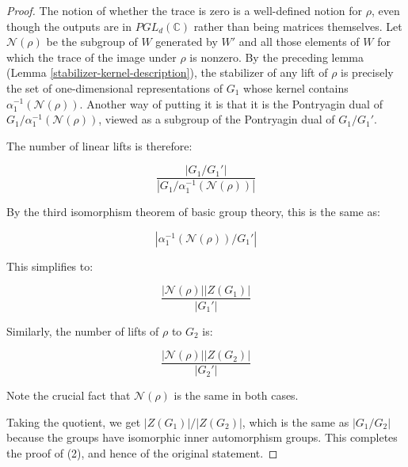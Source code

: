 \begin{proof}
  The notion of whether the trace is zero is a well-defined notion for
  $\rho$, even though the outputs are in $PGL_d(\mathbb{C})$ rather
  than being matrices themselves. Let $\mathcal{N}(\rho)$ be the
  subgroup of $W$ generated by $W'$ and all those elements of $W$ for
  which the trace of the image under $\rho$ is nonzero. By the
  preceding lemma (Lemma \ref{stabilizer-kernel-description}), the
  stabilizer of any lift of $\rho$ is precisely the set of
  one-dimensional representations of $G_1$ whose kernel contains
  $\alpha_1^{-1}(\mathcal{N}(\rho))$. Another way of putting it is
  that it is the Pontryagin dual of
  $G_1/\alpha_1^{-1}(\mathcal{N}(\rho))$, viewed as a subgroup of the
  Pontryagin dual of $G_1/G_1'$.


  The number of linear lifts is therefore:

  $$\frac{|G_1/G_1'|}{|G_1/\alpha_1^{-1}(\mathcal{N}(\rho))|}$$

  By the third isomorphism theorem of basic group theory, this is the
  same as:

  $$|\alpha_1^{-1}(\mathcal{N}(\rho))/G_1'|$$

  This simplifies to:

  $$\frac{|\mathcal{N}(\rho)||Z(G_1)|}{|G_1'|}$$

  Similarly, the number of lifts of $\rho$ to $G_2$ is:

  $$\frac{|\mathcal{N}(\rho)||Z(G_2)|}{|G_2'|}$$

  Note the crucial fact that $\mathcal{N}(\rho)$ is the same in both
  cases.

  Taking the quotient, we get $|Z(G_1)|/|Z(G_2)|$, which is the same
  as $|G_1/G_2|$ because the groups have isomorphic inner automorphism
  groups. This completes the proof of (2), and hence of the original
  statement.
\end{proof}

%





